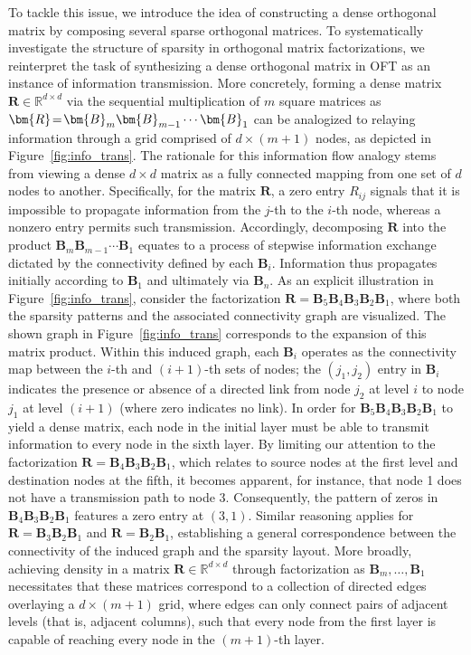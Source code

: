 To tackle this issue, we introduce the idea of constructing a dense orthogonal matrix by composing several sparse orthogonal matrices. To systematically investigate the structure of sparsity in orthogonal matrix factorizations, we reinterpret the task of synthesizing a dense orthogonal matrix in OFT as an instance of information transmission. More concretely, forming a dense matrix $\bm{R}\in\mathbb{R}^{d\times d}$ via the sequential multiplication of $m$ square matrices as $\thickmuskip=2mu \medmuskip=2mu \bm{R}=\bm{B}_m\bm{B}_{m-1}\cdots\bm{B}_1$ can be analogized to relaying information through a grid comprised of $d\times (m+1)$ nodes, as depicted in Figure~\ref{fig:info_trans}. The rationale for this information flow analogy stems from viewing a dense $d\times d$ matrix as a fully connected mapping from one set of $d$ nodes to another. Specifically, for the matrix $\bm{R}$, a zero entry $R_{ij}$ signals that it is impossible to propagate information from the $j$-th to the $i$-th node, whereas a nonzero entry permits such transmission. Accordingly, decomposing $\bm{R}$ into the product $\bm{B}_m\bm{B}_{m-1}\cdots\bm{B}_1$ equates to a process of stepwise information exchange dictated by the connectivity defined by each $\bm{B}_i$. Information thus propagates initially according to $\bm{B}_1$ and ultimately via $\bm{B}_n$. As an explicit illustration in Figure~\ref{fig:info_trans}, consider the factorization $\bm{R}=\bm{B}_5\bm{B}_4\bm{B}_3\bm{B}_2\bm{B}_1$, where both the sparsity patterns and the associated connectivity graph are visualized. The shown graph in Figure~\ref{fig:info_trans} corresponds to the expansion of this matrix product. Within this induced graph, each $\bm{B}_i$ operates as the connectivity map between the $i$-th and $(i+1)$-th sets of nodes; the $(j_1,j_2)$ entry in $\bm{B}_i$ indicates the presence or absence of a directed link from node $j_2$ at level $i$ to node $j_1$ at level $(i+1)$ (where zero indicates no link). In order for $\bm{B}_5\bm{B}_4\bm{B}_3\bm{B}_2\bm{B}_1$ to yield a dense matrix, each node in the initial layer must be able to transmit information to every node in the sixth layer. By limiting our attention to the factorization $\bm{R}=\bm{B}_4\bm{B}_3\bm{B}_2\bm{B}_1$, which relates to source nodes at the first level and destination nodes at the fifth, it becomes apparent, for instance, that node 1 does not have a transmission path to node 3. Consequently, the pattern of zeros in $\bm{B}_4\bm{B}_3\bm{B}_2\bm{B}_1$ features a zero entry at $(3,1)$. Similar reasoning applies for $\bm{R}=\bm{B}_3\bm{B}_2\bm{B}_1$ and $\bm{R}=\bm{B}_2\bm{B}_1$, establishing a general correspondence between the connectivity of the induced graph and the sparsity layout. More broadly, achieving density in a matrix $\bm{R}\in\mathbb{R}^{d\times d}$ through factorization as $\bm{B}_m,\ldots,\bm{B}_1$ necessitates that these matrices correspond to a collection of directed edges overlaying a $d\times (m+1)$ grid, where edges can only connect pairs of adjacent levels (that is, adjacent columns), such that every node from the first layer is capable of reaching every node in the $(m+1)$-th layer.

